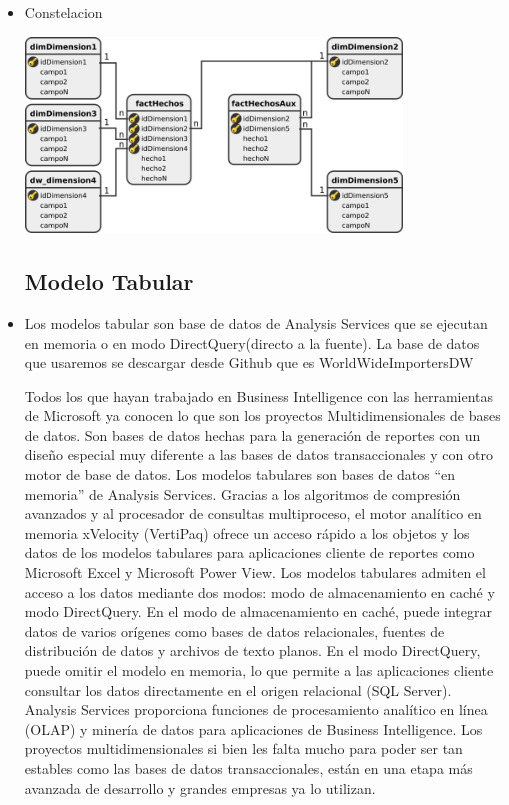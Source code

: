 \begin{itemize}
\item Constelacion
\begin{center}
\includegraphics[width=10cm]{./Imagenes/3}
\end{center}

\subsection{Modelo Tabular}
	\item Los modelos tabular son base de datos de Analysis Services que se ejecutan en memoria o en modo DirectQuery(directo a la fuente). La base de datos que usaremos se descargar desde Github que es WorldWideImportersDW 

Todos los que hayan trabajado en Business Intelligence con las herramientas de Microsoft ya conocen lo que son los proyectos Multidimensionales de bases de datos. Son bases de datos hechas para la generación de reportes con un diseño especial muy diferente a las bases de datos transaccionales y con otro motor de base de datos.
Los modelos tabulares son bases de datos “en memoria” de Analysis Services. Gracias a los algoritmos de compresión avanzados y al procesador de consultas multiproceso, el motor analítico en memoria xVelocity (VertiPaq) ofrece un acceso rápido a los objetos y los datos de los modelos tabulares para aplicaciones cliente de reportes como Microsoft Excel y Microsoft Power View.
Los modelos tabulares admiten el acceso a los datos mediante dos modos: modo de almacenamiento en caché y modo DirectQuery. En el modo de almacenamiento en caché, puede integrar datos de varios orígenes como bases de datos relacionales, fuentes de distribución de datos y archivos de texto planos. En el modo DirectQuery, puede omitir el modelo en memoria, lo que permite a las aplicaciones cliente consultar los datos directamente en el origen relacional (SQL Server).
Analysis Services proporciona funciones de procesamiento analítico en línea (OLAP) y minería de datos para aplicaciones de Business Intelligence.
Los proyectos multidimensionales si bien les falta mucho para poder ser tan estables como las bases de datos transaccionales, están en una etapa más avanzada de desarrollo y grandes empresas ya lo utilizan.


\end{itemize}
